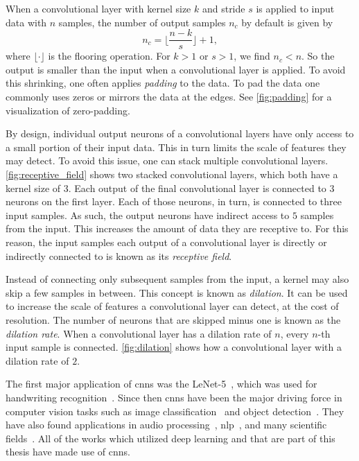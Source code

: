 When a convolutional layer with kernel size $k$ and stride $s$ is applied to input data with $n$ samples, the number of output samples $n_c$ by default is given by
\begin{equation}
	n_c = \lfloor\frac{n-k}{s}\rfloor + 1,
\end{equation}
where $\lfloor\cdot\rfloor$ is the flooring operation. For $k>1$ or $s>1$, we find $n_c<n$. So the output is smaller than the input when a convolutional layer is applied. To avoid this shrinking, one often applies \emph{padding} to the data. To pad the data one commonly uses zeros or mirrors the data at the edges. See \autoref{fig:padding} for a visualization of zero-padding.

By design, individual output neurons of a convolutional layers have only access to a small portion of their input data. This in turn limits the scale of features they may detect. To avoid this issue, one can stack multiple convolutional layers. \autoref{fig:receptive_field} shows two stacked convolutional layers, which both have a kernel size of $3$. Each output of the final convolutional layer is connected to $3$ neurons on the first layer. Each of those neurons, in turn, is connected to three input samples. As such, the output neurons have indirect access to $5$ samples from the input. This increases the amount of data they are receptive to. For this reason, the input samples each output of a convolutional layer is directly or indirectly connected to is known as its \emph{receptive field}.

Instead of connecting only subsequent samples from the input, a kernel may also skip a few samples in between. This concept is known as \emph{dilation}. It can be used to increase the scale of features a convolutional layer can detect, at the cost of resolution. The number of neurons that are skipped minus one is known as the \emph{dilation rate}. When a convolutional layer has a dilation rate of $n$, every $n$-th input sample is connected. \autoref{fig:dilation} shows how a convolutional layer with a dilation rate of $2$.

The first major application of \acrshort{cnn}s was the LeNet-5~\cite{LeCun:1998aaa}, which was used for handwriting recognition~\cite{Goodfellow:2016:DNN, Geron:2017aaa}. Since then \acrshort{cnn}s have been the major driving force in computer vision tasks such as image classification~\cite{krizhevsky:2012, Simonyan:2014aaa, Howard:2017aaa, Elharrouss:2022aaa} and object detection~\cite{Geron:2017aaa, Elharrouss:2022aaa, Girshick:2013aaa, Ren:2015aaa, Redmon:2015aaa, Liu:2016aaa}. They have also found applications in audio processing~\cite{Oord:2016wav}, \acrshort{nlp}~\cite{Yin:2017aaa}, and many scientific fields~\cite{Deiana:2021niw}. All of the works which utilized deep learning and that are part of this thesis have made use of \acrshort{cnn}s.


